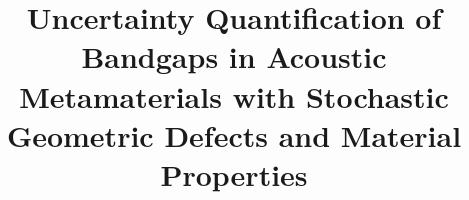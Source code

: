 \documentclass[preprint,review,12pt]{elsarticle}
\begin{document}
\begin{frontmatter}


\title{Uncertainty Quantification of Bandgaps in Acoustic Metamaterials with Stochastic Geometric Defects and Material Properties}




\end{frontmatter}
\end{document}
